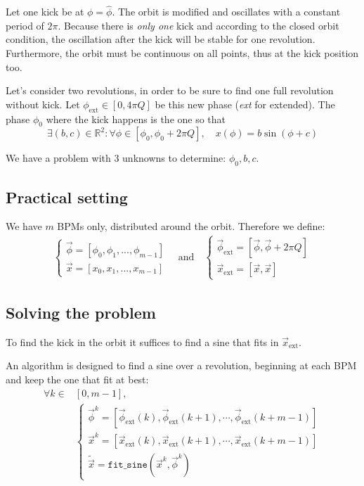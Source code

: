 Let one kick be at $\phi = \hat{\phi}$. The orbit is modified and oscillates with a constant period of $2 \pi$. Because there is {\em only one} kick and according to the closed orbit condition, the oscillation after the kick will be stable for one revolution. Furthermore, the orbit must be continuous on all points, thus at the kick position too.

Let's consider two revolutions, in order to be sure to find one full revolution without kick. Let $\phi_\mathrm{ext} \in [0, 4 \pi Q]$ be this new phase (\textit{ext} for extended). The phase $\phi_0$ where the kick happens is the one so that 
\begin{equation}
\exists (b, c) \in \mathbb{R}^2:
\forall \phi \in [\phi_0, \phi_0 + 2 \pi Q], \quad
x(\phi) = b \sin(\phi + c)
\end{equation}

We have a problem with 3 unknowns to determine: $\phi_0, b, c$. 

\subsection{Practical setting}

We have $m$ BPMs only, distributed around the orbit.
Therefore we define:
\begin{align}
\begin{cases}
\vec{\phi} = [\phi_0, \phi_1, ..., \phi_{m-1}] \\
\vec{x} = [x_0, x_1, ..., x_{m-1}]
\end{cases} \quad \mathrm{and} \quad
\begin{cases}
\vec{\phi}_\mathrm{ext} = [\vec{\phi}, \vec{\phi}+2\pi Q ]\\
\vec{x}_\mathrm{ext} = [\vec{x}, \vec{x}]
\end{cases}
\end{align}

\subsection{Solving the problem}

To find the kick in the orbit it suffices to find a sine that fits in $\vec{x}_\mathrm{ext}$.

An algorithm is designed to find a sine over a revolution, beginning at each BPM and keep the one that fit at best:
\begin{align}
\forall k \in &[0, m-1], \nonumber \\
&\begin{cases}
\vec{\phi}^k = [\vec{\phi}_\mathrm{ext}(k), \vec{\phi}_\mathrm{ext}(k+1), \cdots,  \vec{\phi}_\mathrm{ext}(k+m-1)]\\
\vec{x}^k = [\vec{x}_\mathrm{ext}(k), \vec{x}_\mathrm{ext}(k+1), \cdots,  \vec{x}_\mathrm{ext}(k+m-1)]\\
\tilde{\vec{x}} = \mathtt{fit\_sine}(\vec{x}^k, \vec{\phi}^k)
\end{cases}
\end{align}

